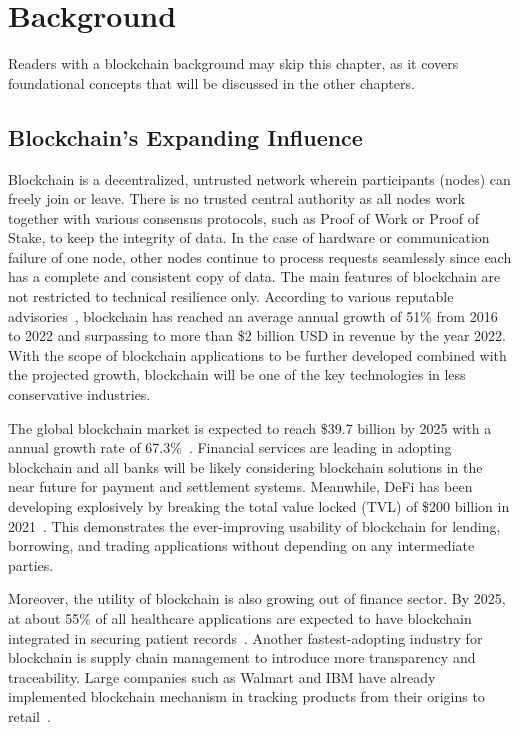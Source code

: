 
\chapter{Background}\label{ch:background}
Readers with a blockchain background may skip this chapter, as it covers foundational concepts that will be discussed in the other chapters.

\section{Blockchain's Expanding Influence}
Blockchain is a decentralized, untrusted network wherein participants (nodes) can freely join or leave. There is no trusted central authority as all nodes work together with various consensus protocols, such as Proof of Work or Proof of Stake, to keep the integrity of data. In the case of hardware or communication failure of one node, other nodes continue to process requests seamlessly since each has a complete and consistent copy of data. The main features of blockchain are not restricted to technical resilience only. According to various reputable advisories~\cite{Gartner,Reportlinker}, blockchain has reached an average annual growth of 51\% from 2016 to 2022 and surpassing to more than \$2 billion USD in revenue by the year 2022. With the scope of blockchain applications to be further developed combined with the projected growth, blockchain will be one of the key technologies in less conservative industries.

The global blockchain market is expected to reach \$39.7 billion by 2025 with a annual growth rate of 67.3\%~\cite{GrandViewResearch2020}. Financial services are leading in adopting blockchain and all banks will be likely considering blockchain solutions in the near future for payment and settlement systems. Meanwhile, DeFi has been developing explosively by breaking the total value locked (TVL) of \$200 billion in 2021~\cite{MarketsandMarkets2020}. This demonstrates the ever-improving usability of blockchain for lending, borrowing, and trading applications without depending on any intermediate parties.

Moreover, the utility of blockchain is also growing out of finance sector. By 2025, at about 55\% of all healthcare applications are expected to have blockchain integrated in securing patient records~\cite{XcubeLabs2020}. Another fastest-adopting industry for blockchain is supply chain management to introduce more transparency and traceability. Large companies such as Walmart and IBM have already implemented blockchain mechanism in tracking products from their origins to retail~\cite{Sristy2021}.

